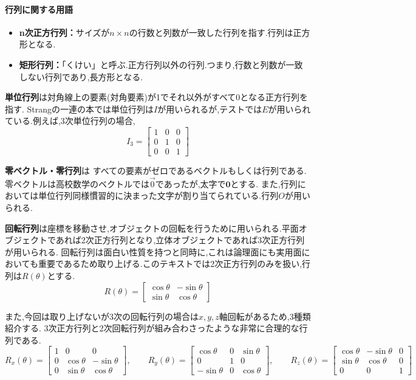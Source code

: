 \paragraph{行列に関する用語}
\begin{itemize}
    \item \textbf{n次正方行列：}サイズが$n\times n$の行数と列数が一致した行列を指す.行列は正方形となる.
    \item \textbf{矩形行列：}「くけい」と呼ぶ.正方行列以外の行列.つまり,行数と列数が一致しない行列であり,長方形となる.
\end{itemize}

\textbf{単位行列}は対角線上の要素(対角要素)が1でそれ以外がすべて0となる正方行列を指す.
Strangの一連の本では単位行列は$I$が用いられるが,テストでは$E$が用いられている.例えば,3次単位行列の場合,
\[
    I_3 = \begin{bmatrix}
        1 & 0 & 0 \\ 0 & 1 & 0 \\ 0 & 0 & 1
    \end{bmatrix}
\]

\textbf{零ベクトル・零行列}は
すべての要素がゼロであるベクトルもしくは行列である.
零ベクトルは高校数学のベクトルでは$\vec{0}$であったが,太字で$\mathbf{0}$とする.
また,行列においては単位行列同様慣習的に決まった文字が割り当てられている.行列$O$が用いられる.

\textbf{回転行列}は座標を移動させ,オブジェクトの回転を行うために用いられる.平面オブジェクトであれば2次正方行列となり,立体オブジェクトであれば3次正方行列が用いられる.
回転行列は面白い性質を持つと同時に,これは論理面にも実用面においても重要であるため取り上げる.このテキストでは2次正方行列のみを扱い,行列は$R(\theta)$とする.
\[
    R(\theta) = \begin{bmatrix}
        \cos\theta & -\sin\theta \\ \sin\theta & \cos\theta
    \end{bmatrix}
\]

また,今回は取り上げないが3次の回転行列の場合は$x,y,z$軸回転があるため,3種類紹介する.
3次正方行列と2次回転行列が組み合わさったような非常に合理的な行列である.
\[
    R_x(\theta) = \begin{bmatrix}
        1 & 0 & 0 \\
        0 & \cos\theta & -\sin\theta \\ 
        0 & \sin\theta & \cos\theta
    \end{bmatrix},\qquad
    R_y(\theta) = \begin{bmatrix}
        \cos\theta & 0 & \sin\theta \\ 
        0 & 1 & 0 \\
        -\sin\theta & 0 & \cos\theta 
    \end{bmatrix},\qquad
    R_z(\theta) = \begin{bmatrix}
        \cos\theta & -\sin\theta & 0 \\
        \sin\theta & \cos\theta & 0 \\
        0 & 0 & 1
    \end{bmatrix}
\]

